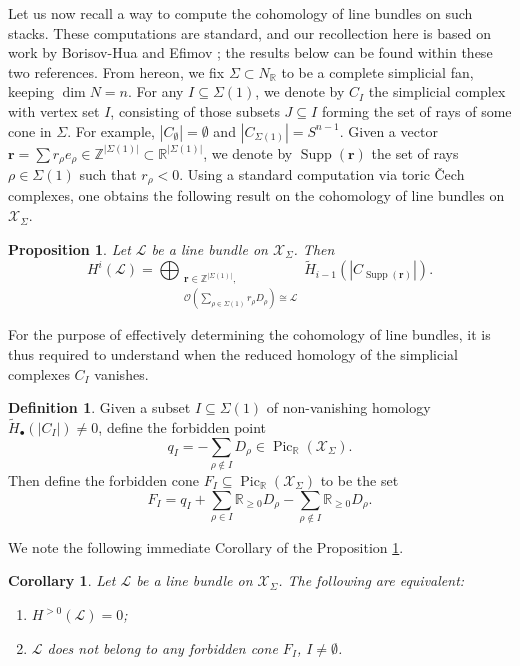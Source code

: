 \documentclass[reqno, 12pt]{amsart}
\newtheorem{proposition}[theorem]{Proposition}
\newtheorem{corollary}[theorem]{Corollary}
\theoremstyle{definition}
\newtheorem{definition}[theorem]{Definition}
\numberwithin{equation}{section}
\newcommand{\newterm}{\textsf}
\newcommand{\Z}{\mathbb{Z}}
\newcommand{\R}{\mathbb{R}}
\def\O{\mathcal{O}}
\begin{document}
Let us now recall a way to compute the cohomology of line bundles on such stacks. These computations are standard, and our recollection here is based on work by Borisov-Hua \cite{BH09} and Efimov \cite{Efimov14}; the results below can be found within these two references. From hereon, we fix $\Sigma\subset N_\R$ to be a complete simplicial fan, keeping $\dim N=n$. For any $I\subseteq \Sigma(1)$, we denote by $C_I$ the simplicial complex with vertex set $I$, consisting of those subsets $J\subseteq I$ forming the set of rays of some cone in $\Sigma$. For example, $|C_\emptyset|=\emptyset$ and $|C_{\Sigma(1)}|=S^{n-1}$. Given a vector $\mathbf{r}=\sum r_\rho e_\rho\in \Z^{|\Sigma(1)|}\subset \R^{|\Sigma(1)|}$, we denote by $\operatorname{Supp}(\mathbf{r})$ the set of rays $\rho\in \Sigma(1)$ such that $r_\rho<0$. Using a standard computation via toric \v{C}ech complexes, one obtains the following result on the cohomology of line bundles on $\mathcal{X}_\Sigma$.

\begin{proposition}
    \label{Prop:CohoCech}
    Let $\mathcal{L}$ be a line bundle on $\mathcal{X}_\Sigma$. Then \[
    H^i(\mathcal{L})=\bigoplus_{\substack{\mathbf{r}\in \Z^{|\Sigma(1)|},\\ \O(\sum_{\rho\in \Sigma(1)}r_\rho D_\rho)\cong \mathcal{L}}}\tilde{H}_{i-1}(|C_{\operatorname{Supp}(\mathbf{r})}|).
    \]
\end{proposition}

For the purpose of effectively determining the cohomology of line bundles, it is thus required to understand when the reduced homology of the simplicial complexes $C_I$ vanishes. \begin{definition}
    \label{Def:ForbiddenPoint}
    Given a subset $I\subseteq \Sigma(1)$ of non-vanishing homology $\tilde{H}_\bullet(|C_I|)\neq 0$, define the \newterm{forbidden point}
\[
q_I=-\sum_{\rho\not\in I}D_\rho\in \operatorname{Pic}_\R(\mathcal{X}_\Sigma).
\]
Then define the \newterm{forbidden cone} $F_I\subseteq \operatorname{Pic}_\R(\mathcal{X}_\Sigma)$ to be the set\[
F_I=q_I+\sum_{\rho\in I}\R_{\ge0}D_\rho-\sum_{\rho\not\in I}\R_{\ge0}D_\rho.
\]
\end{definition}
\noindent We note the following immediate Corollary of the Proposition \ref{Prop:CohoCech}.
\begin{corollary}
    \label{Cor:AcyclicForbidden}
    Let $\mathcal{L}$ be a line bundle on $\mathcal{X}_\Sigma$. The following are equivalent:
    \begin{enumerate}
        \item $H^{>0}(\mathcal{L})=0$;
        \item $\mathcal{L}$ does not belong to any forbidden cone $F_I$, $I\neq \emptyset$.
    \end{enumerate}
\end{corollary}
\end{document}
